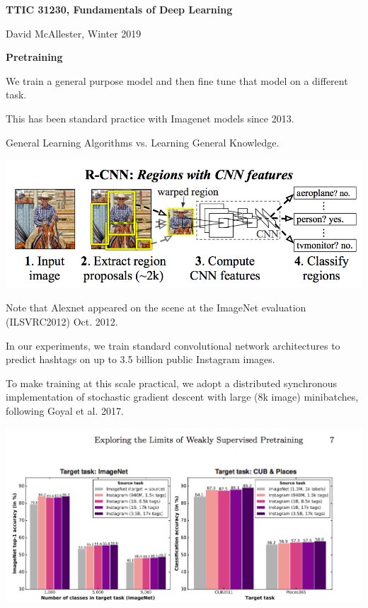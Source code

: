 





{\Huge
  \centerline{\bf TTIC 31230,  Fundamentals of Deep Learning}
  \vfill
  \centerline{David McAllester, Winter 2019}
  \vfill
  \centerline{\bf Pretraining}



\vfill
We train a general purpose model and then fine tune that model on a different task.

\vfill
This has been standard practice with Imagenet models since 2013.

\vfill
General Learning Algorithms vs. Learning General Knowledge.


\centerline{\includegraphics[width=10.0 in]{../images/R-CNN}}

Note that Alexnet appeared on the scene at the ImageNet evaluation (ILSVRC2012) Oct. 2012.


In our experiments, we train standard convolutional network architectures to
predict hashtags on up to 3.5 billion public Instagram images.

\vfill
To make training at this scale practical, we adopt a distributed synchronous implementation of
stochastic gradient descent with large (8k image) minibatches, following Goyal et al. 2017.


\centerline{\includegraphics[width=10.0 in]{../images/InstagramPre}}

}
